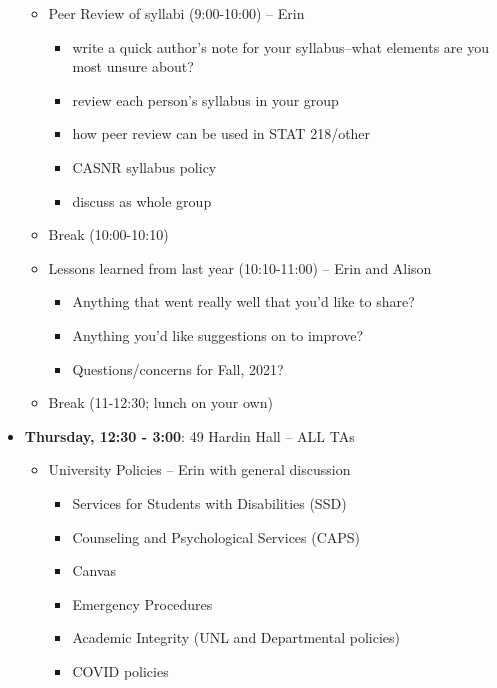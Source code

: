 \documentclass{article}
\begin{document}
\begin{itemize}
\begin{itemize}
\item Peer Review of syllabi (9:00-10:00) -- Erin
\begin{itemize}
\item write a quick author's note for your syllabus--what elements are you most unsure about?
\item review each person's syllabus in your group 
\item how peer review can be used in STAT 218/other
\item CASNR syllabus policy
\item discuss as whole group
\end{itemize}
\item Break (10:00-10:10)
\item Lessons learned from last year (10:10-11:00) -- Erin and Alison
\begin{itemize}
\item Anything that went really well that you'd like to share?
\item Anything you'd like suggestions on to improve?
\item Questions/concerns for Fall, 2021?
\end{itemize}
\item Break (11-12:30; lunch on your own)
\end{itemize}
\item \textbf{Thursday, 12:30 - 3:00}: 49 Hardin Hall -- ALL TAs
\begin{itemize}
\item University Policies -- Erin with general discussion
\begin{itemize}
\item Services for Students with Disabilities (SSD)
\item Counseling and Psychological Services (CAPS)
\item Canvas
\item Emergency Procedures
\item Academic Integrity (UNL and Departmental policies)
\item COVID policies
\end{itemize}
\end{itemize}


\end{itemize}
\end{document}
